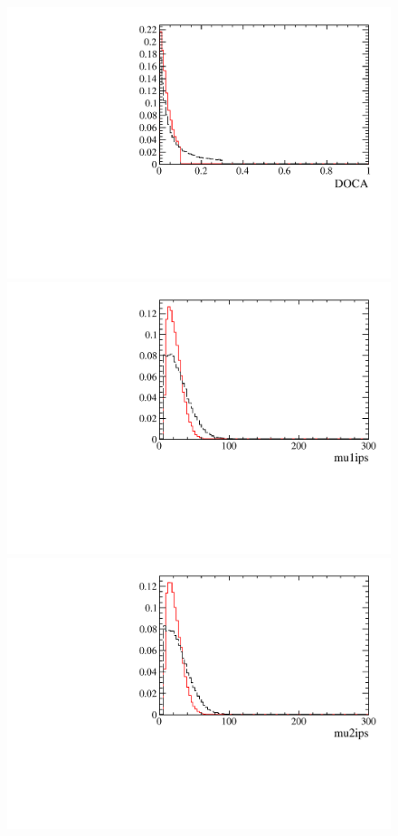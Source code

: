 \begin{figure} [htb!]
\begin{center}
\includegraphics[scale=0.20]{figs/DOCAPARTIAL.pdf}
\includegraphics[scale=0.20]{figs/mu1ipsPARTIAL.pdf}
\includegraphics[scale=0.20]{figs/mu2ipsPARTIAL.pdf}

\end{center}
\end{figure}
